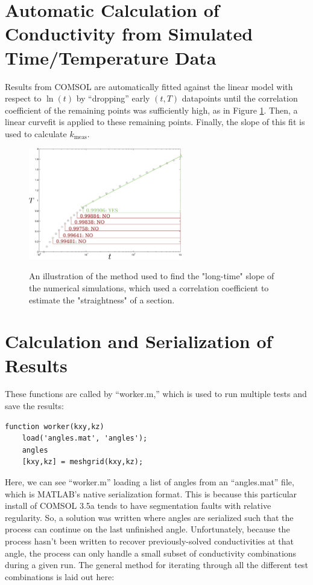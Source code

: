 \section{Automatic Calculation of Conductivity from Simulated Time/Temperature Data}

Results from COMSOL are automatically fitted against the linear model with
respect to \(\ln(t)\) by ``dropping'' early \((t,T)\) datapoints until the
correlation coefficient of the remaining points was sufficiently high, as in Figure \ref{fig:curvefit}. Then, a
linear curvefit is applied to these remaining points. Finally, the slope of this fit is
used to calculate \(k_{\textrm{meas}}\).

\begin{figure}[h]
\centering
\includegraphics[width=0.6\textwidth]{fig/curvefit.png}
\label{fig:curvefit}
\caption{An illustration of the method used to find the "long-time" slope of the numerical simulations, which used a correlation coefficient to estimate the "straightness" of a section.}
\end{figure}

\section{Calculation and Serialization of Results}

These functions are called by ``worker.m,'' which is used to run multiple
tests and save the results:

\small
\begin{verbatim}
function worker(kxy,kz)
    load('angles.mat', 'angles');
    angles
    [kxy,kz] = meshgrid(kxy,kz);
\end{verbatim}
\normalsize

Here, we can see ``worker.m'' loading a list of angles from an ``angles.mat''
file, which is MATLAB's native serialization format. This is because this particular install of COMSOL 3.5a
tends to have segmentation faults with relative regularity. So, a
solution was written where angles are serialized such that the
process can continue on the last unfinished angle. Unfortunately, because the
process hasn't been written to recover previously-solved conductivities at that
angle, the process can only handle a small subset of conductivity combinations
during a given run. The general method for iterating through all the different
test combinations is laid out here:

